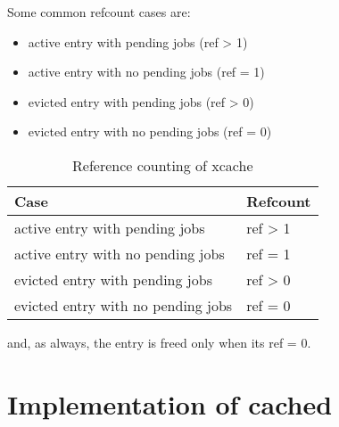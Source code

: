 Some common refcount cases are:

\begin{itemize}
	\item active entry with pending jobs (ref > 1)
	\item active entry with no pending jobs (ref = 1)
	\item evicted entry with pending jobs (ref > 0)
	\item evicted entry with no pending jobs (ref = 0)
\end{itemize}

\begin{table}[tbp]
	\centering
	\begin{tabular}{ | l | l | }
		\hline
		Case & Refcount \\ \hline \hline
		active entry with pending jobs & ref > 1 \\ \hline
		active entry with no pending jobs & ref = 1 \\ \hline
		evicted entry with pending jobs & ref > 0 \\ \hline
		evicted entry with no pending jobs & ref = 0 \\ \hline
	\end{tabular}
	\caption{Reference counting of xcache}
	\label{tab:refcount}
\end{table}

and, as always, the entry is freed only when its ref = 0.

\section{Implementation of cached}\label{sec:cached-imp}

